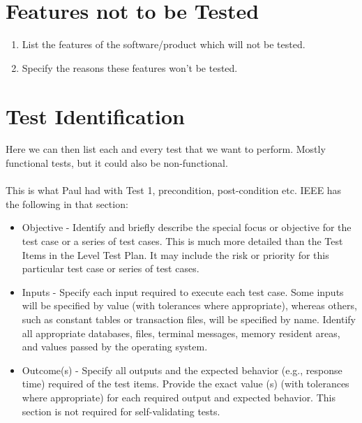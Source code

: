 \section{Features not to be Tested}

\begin{enumerate}
	\item List the features of the software/product which will not be tested.
	\item Specify the reasons these features won’t be tested.
\end{enumerate}

\section{Test Identification}

Here we can then list each and every test that we want to perform. Mostly functional tests, but it could also be non-functional.\\\\

This is what Paul had with Test 1, precondition, post-condition etc. IEEE has the following in that section:
\begin{itemize}
	\item  Objective - Identify and briefly describe the special focus or objective for the test case or a series of test cases.
This is much more detailed than the Test Items in the Level Test Plan. It may include the risk or priority for this particular test case or series of test cases.
	\item  Inputs - Specify each input required to execute each test case. Some inputs will be specified by value (with
tolerances where appropriate), whereas others, such as constant tables or transaction files, will be
specified by name. Identify all appropriate databases, files, terminal messages, memory resident areas,
and values passed by the operating system.
	\item  Outcome(s) - Specify all outputs and the expected behavior (e.g., response time) required of the test items. Provide
the exact value (s) (with tolerances where appropriate) for each required output and expected behavior.
This section is not required for self-validating tests.
\end{itemize}

